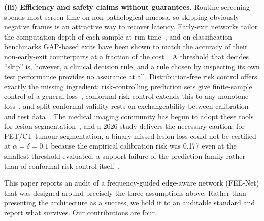 \documentclass[journal]{IEEEtran}
\begin{document}
\textbf{(iii) Efficiency and safety claims without guarantees.} Routine screening spends most screen time on non-pathological mucosa, so skipping obviously negative frames is an attractive way to recover latency. Early-exit networks tailor the computation depth of each sample at run time~\cite{laskaridis2021earlyexit}, and on classification benchmarks GAP-based exits have been shown to match the accuracy of their non-early-exit counterparts at a fraction of the cost~\cite{demir2024earlyexit}. A threshold that decides ``skip'' is, however, a clinical decision rule, and a rule chosen by inspecting its own test performance provides no assurance at all. Distribution-free risk control offers exactly the missing ingredient: risk-controlling prediction sets give finite-sample control of a general loss~\cite{bates2021rcps}, conformal risk control extends this to any monotone loss~\cite{angelopoulos2022crc}, and split conformal validity rests on exchangeability between calibration and test data~\cite{angelopoulos2021gentle}. The medical imaging community has begun to adopt these tools for lesion segmentation~\cite{tan2025cls,dai2025crcfdr}, and a 2026 study delivers the necessary caution: for PET/CT tumour segmentation, a binary missed-lesion loss could not be certified at $\alpha=\delta=0.1$ because the empirical calibration risk was 0.177 even at the smallest threshold evaluated, a support failure of the prediction family rather than of conformal risk control itself~\cite{zheng2026crc}.

This paper reports an audit of a frequency-guided edge-aware network (FEE-Net) that was designed around precisely the three assumptions above. Rather than presenting the architecture as a success, we hold it to an auditable standard and report what survives. Our contributions are four.
\end{document}
